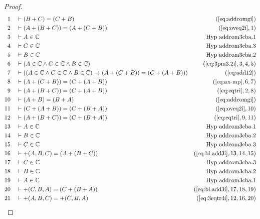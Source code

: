 \begin{proof}
\begin{align}
  1 &&  & \vdash ( B + C ) = ( C + B )&(\mbox{\ref{eq:addcomgi}})\notag
  \\ 2 &&  & \vdash ( A + ( B + C ) ) = ( A + ( C + B ) )&(\mbox{\ref{eq:oveq2i}},1)\notag
  \\ 3 &&  & \vdash A \in
\mathbb{C}&\text{Hyp~addcom3cba.1}\notag%
  \\ 4 &&  & \vdash C \in
\mathbb{C}&\text{Hyp~addcom3cba.3}\notag%
  \\ 5 &&  & \vdash B \in
\mathbb{C}&\text{Hyp~addcom3cba.2}\notag%
  \\ 6 &&  & \vdash ( A \in \mathbb{C} \wedge C \in \mathbb{C} \wedge B \in \mathbb{C} )&(\mbox{\ref{eq:3pm3.2i}},3,4,5)\notag
  \\ 7 &&  & \vdash ( ( A \in \mathbb{C} \wedge C \in \mathbb{C} \wedge B \in \mathbb{C} ) \rightarrow ( A + ( C + B ) ) = ( C + ( A + B ) ) )&(\mbox{\ref{eq:add12}})\notag
  \\ 8 &&  & \vdash ( A + ( C + B ) ) = ( C + ( A + B ) )&(\mbox{\ref{eq:ax-mp}},6,7)\notag
  \\ 9 &&  & \vdash ( A + ( B + C ) ) = ( C + ( A + B ) )&(\mbox{\ref{eq:eqtri}},2,8)\notag
  \\ 10 &&  & \vdash ( A + B ) = ( B + A )&(\mbox{\ref{eq:addcomgi}})\notag
  \\ 11 &&  & \vdash ( C + ( A + B ) ) = ( C + ( B + A ) )&(\mbox{\ref{eq:oveq2i}},10)\notag
  \\ 12 &&  & \vdash ( A + ( B + C ) ) = ( C + ( B + A ) )&(\mbox{\ref{eq:eqtri}},9,11)\notag
  \\ 13 &&  & \vdash A \in
\mathbb{C}&\text{Hyp~addcom3cba.1}\notag%
  \\ 14 &&  & \vdash B \in
\mathbb{C}&\text{Hyp~addcom3cba.2}\notag%
  \\ 15 &&  & \vdash C \in
\mathbb{C}&\text{Hyp~addcom3cba.3}\notag%
  \\ 16 &&  & \vdash +( A , B , C ) = ( A + ( B + C ) )&(\mbox{\ref{eq:bl.add3i}},13,14,15)\notag
  \\ 17 &&  & \vdash C \in
\mathbb{C}&\text{Hyp~addcom3cba.3}\notag%
  \\ 18 &&  & \vdash B \in
\mathbb{C}&\text{Hyp~addcom3cba.2}\notag%
  \\ 19 &&  & \vdash A \in
\mathbb{C}&\text{Hyp~addcom3cba.1}\notag%
  \\ 20 &&  & \vdash +( C , B , A ) = ( C + ( B + A ) )&(\mbox{\ref{eq:bl.add3i}},17,18,19)\notag
  \\ 21 &&  & \vdash +( A , B , C ) = +( C , B , A )&(\mbox{\ref{eq:3eqtr4i}},12,16,20)\notag
\end{align}
\end{proof}

